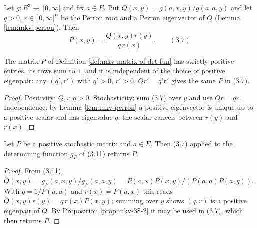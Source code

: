 \begin{definition}
    \label{def:mkv-matrix-of-det-fun}
    \leanok

    Let $g : E^3 \to \,]0,\infty[$ and fix $a \in E$. Put
    $Q(x,y) = g(a,x,y)/g(a,a,y)$ and let $q > 0$, $r \in \,]0,\infty[^E$ be the Perron root and a
    Perron eigenvector of $Q$ (Lemma \ref{lem:mkv-perron}). Then
    \[
        P(x,y) = \frac{Q(x,y) r(y)}{q\, r(x)}. \qquad (3.7)
    \]
\end{definition}

\begin{proposition}
    \label{prop:mkv-38-2}
    \leanok

    The matrix $P$ of Definition \ref{def:mkv-matrix-of-det-fun} has strictly positive entries,
    its rows sum to $1$, and it is independent of the choice of positive eigenpair: any
    $(q', r')$ with $q' > 0$, $r' > 0$, $Qr' = q'r'$ gives the same $P$ in (3.7).
\end{proposition}
\begin{proof}
    \leanok

    Positivity: $Q, r, q > 0$. Stochasticity: sum (3.7) over $y$ and use $Qr = qr$.
    Independence: by Lemma \ref{lem:mkv-perron} a positive eigenvector is unique up to a
    positive scalar and has eigenvalue $q$; the scalar cancels between $r(y)$ and $r(x)$.
\end{proof}

\begin{theorem}
    \label{thm:mkv-step2}
    \leanok

    Let $P$ be a positive stochastic matrix and $a \in E$. Then (3.7) applied to the
    determining function $g_P$ of (3.11) returns $P$.
\end{theorem}
\begin{proof}
    \leanok

    From (3.11), $Q(x,y) = g_P(a,x,y)/g_P(a,a,y) = P(a,x)P(x,y)/(P(a,a)P(a,y))$. With
    $q = 1/P(a,a)$ and $r(x) = P(a,x)$ this reads $Q(x,y)r(y) = q\,r(x)P(x,y)$; summing over $y$
    shows $(q,r)$ is a positive eigenpair of $Q$. By Proposition \ref{prop:mkv-38-2} it may be
    used in (3.7), which then returns $P$.
\end{proof}

